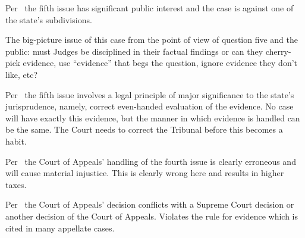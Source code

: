 \documentclass[12pt,\documentclassflag]{michiganCourtOfAppealsBrief}
\begin{document}
Per \cite{MCR 7.305(B)(2)}\ the fifth issue has significant public interest and the case is against one of the state's subdivisions.

The big-picture issue of this case from the point of view of question five and the public: must Judges be disciplined in their factual findings or can they cherry-pick evidence, use ``evidence'' that begs the question, ignore evidence they don't like, etc?

Per \cite{MCR 7.305(B)(3)}\ the fifth issue involves a legal principle of major significance to the state's jurisprudence, namely, correct even-handed evaluation of the evidence. No case will have exactly this evidence, but the manner in which evidence is handled can be the same. The Court needs to correct the Tribunal before this becomes a habit.

Per \cite{MCR 7.305(B)(5a)}\ the Court of Appeals' handling of the fourth  issue is clearly erroneous and will cause material injustice. This is clearly wrong here and results in higher taxes.

Per \cite{MCR 7.305(B)(5b)}\ the Court of Appeals' decision conflicts with a Supreme Court decision or another decision of the Court of Appeals. Violates the rule for evidence which is cited in many appellate cases.










\end{document}
